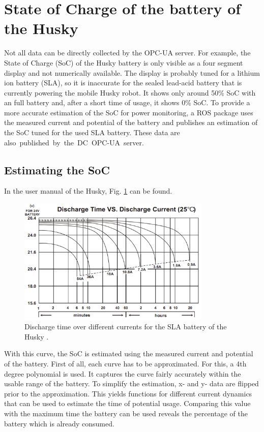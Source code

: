\documentclass[conference]{IEEEtran}
\begin{document}
\section{State of Charge of the  battery of the Husky}
Not all data can be directly collected by the OPC-UA server.
For example, the State of Charge (SoC) of the Husky battery is only visible as a four segment display and not numerically available.
The display is probably tuned for a lithium ion battery (SLA), so it is  inaccurate for the sealed lead-acid battery that is currently powering the mobile Husky robot. It shows only around 50\% SoC with an full battery and, after a short time of usage, it shows 0\% SoC.
To provide a more accurate estimation of the SoC for power monitoring, a ROS package uses the measured current and potential of the battery and publishes an estimation of the SoC tuned for the used SLA battery.
These data are \mbox{also published by the DC OPC-UA server.}
\subsection{Estimating the SoC}
In the user manual of the Husky, Fig. \ref{fig:EndladekuvenSLA} can be found.
\begin{figure}[b]
    \centerline{\includegraphics[width=9.2cm]{Pictures/EndladekuvenSLA.png}}
    \caption{Discharge time over different currents for the SLA battery of the Husky \cite[p.21]{SLAKurven}.}
    \label{fig:EndladekuvenSLA}
\end{figure}
With this curve, the SoC is estimated using the measured current and potential of the battery.
First of all, each curve has to be approximated. For this, a 4th degree polynomial is used.
It captures the curve fairly accurately within the usable range of the battery.
To simplify the estimation,  x- and y- data are flipped prior to the approximation.
This yields functions for different current dynamics that can be used to estimate the time of potential usage.
Comparing this value with the maximum time the battery can be used reveals the percentage of the battery which is already consumed.
\end{document}
